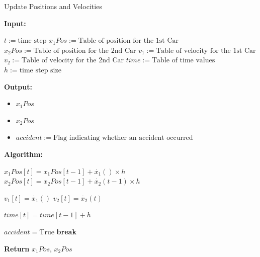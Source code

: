\documentclass{article}
\begin{document}
			\begin{algorithm}[H]
				\caption{Update Positions and Velocities}\label{alg:update_positions}
				\begin{algorithmic}
					\State \textbf{Input:} \\
					\begin{itemize}
						\State $t:=\text{time step}$
						\State $x_1Pos:=\text{Table of position for the 1st Car}$
						\State $x_2Pos:=\text{Table of position for the 2nd Car}$
						\State $v_1:=\text{Table of velocity for the 1st Car}$
						\State $v_2:=\text{Table of velocity for the 2nd Car}$
						\State $time:=\text{Table of time values}$
						\State $h:=\text{time step size}$
					\end{itemize}
					\State \textbf{Output:} \\
					\begin{itemize}
						\item $x_1Pos$ \\
						\item $x_2Pos$
					\end{itemize}
					\begin{itemize}[]
						\item $accident:=\text{Flag indicating whether an accident occurred}$
					\end{itemize}
					\State \textbf{Algorithm:} \\
					\begin{itemize}[]
						\State $x_1Pos[t] = x_1Pos[t-1] + \dot{x_1}() \times h$
						\State $x_2Pos[t] = x_2Pos[t-1] + \dot{x_2}(t-1) \times h$
						
						\State $v_1[t] = \dot{x_1}()$
						\State $v_2[t] = \dot{x_2}(t)$
						
						\State $time[t] = time[t-1] + h$
						
						\State $accident = \text{True}$
						\State \textbf{break}
						\EndIf
						\EndFor
					\end{itemize}
					\State \textbf{Return} $x_1Pos$, $x_2Pos$
				\end{algorithmic}
			\end{algorithm}
			
			
			
\end{document}
